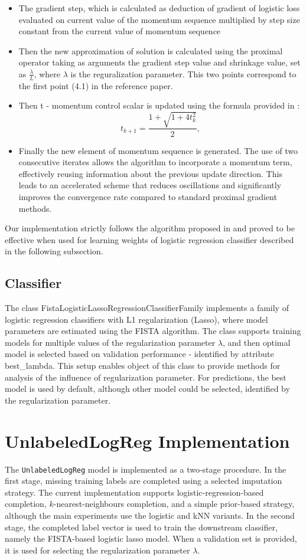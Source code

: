 \documentclass[8pt,a4paper]{extarticle}
\begin{document}
\begin{itemize}
    \item The gradient step, which is calculated as deduction of gradient of logistic loss evaluated on  current value of the momentum sequence multiplied by step size constant from the current value of momentum sequence
    \item Then the new approximation of solution is calculated using the proximal operator taking as arguments the gradient step value and shrinkage value, set as $\frac{\lambda}{L}$, where $\lambda$ is the reguralization parameter. This two points correspond to the first point (4.1) in the reference paper.
    \item Then t - momentum control scalar is updated using the formula provided in \cite{beck2009fast}: \begin{equation}
        t_{k+1} = \frac{1 + \sqrt{1 + 4t_k^2}}{2},
    \end{equation}
    \item Finally the new element of momentum sequence is generated. The use of two consecutive iterates allows the algorithm to incorporate a momentum term, effectively reusing information about the previous update direction. This leads to an accelerated scheme that reduces oscillations and significantly improves the convergence rate compared to standard proximal gradient methods.
\end{itemize}
Our implementation strictly follows the algorithm proposed in \cite{beck2009fast} and proved to be effective when used for learning weights of logistic regression classifier described in the following subsection.
\subsection{Classifier}
The class FistaLogisticLassoRegressionClassifierFamily implements a family of logistic regression classifiers with L1 regularization (Lasso), where model parameters are estimated using the FISTA algorithm. The class supports training models for multiple values of the regularization parameter $\lambda$, and then optimal model is selected based on validation performance - identified by attribute best\_lambda. This setup enables object of this class to provide methods for analysis of the influence of regularization parameter. For predictions, the best model is used by default, although other model could be selected, identified by the regularization parameter.
\section{UnlabeledLogReg Implementation}
The \texttt{UnlabeledLogReg} model is implemented as a two-stage procedure. In the first stage, missing training labels are completed using a selected imputation strategy. The current implementation supports logistic-regression-based completion, $k$-nearest-neighbours completion, and a simple prior-based strategy, although the main experiments use the logistic and kNN variants. In the second stage, the completed label vector is used to train the downstream classifier, namely the FISTA-based logistic lasso model. When a validation set is provided, it is used for selecting the regularization parameter $\lambda$.
\end{document}
